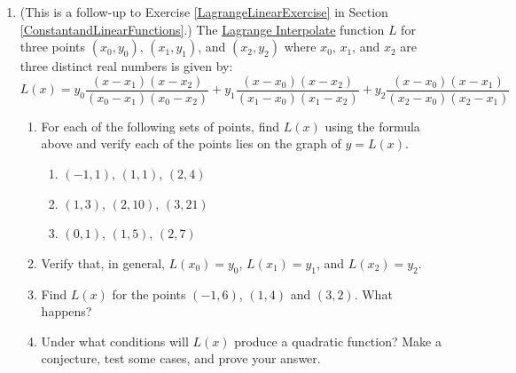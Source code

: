 \documentclass{ximera}
\begin{document}
\begin{enumerate}
\setcounter{enumi}{\value{HW}}



\item \label{LagrangeQuadExercise} (This is a follow-up to Exercise \ref{LagrangeLinearExercise} in Section \ref{ConstantandLinearFunctions}.) The \href{https://en.wikipedia.org/wiki/Lagrange_polynomial}{\underline{Lagrange Interpolate}} function $L$ for three points $(x_{0}, y_{0})$, $(x_{1}, y_{1})$, and  $(x_{2}, y_{2})$ where $x_{0}$,  $x_{1}$, and $x_{2}$ are three distinct real numbers  is given by: \[L(x) = y_{0}  \dfrac{(x - x_{1}) (x - x_{2}) }{(x_{0} - x_{1})(x_{0} - x_{2})}+ y_{1}  \dfrac{(x - x_{0}) (x - x_{2}) }{(x_{1} - x_{0})(x_{1} - x_{2})} +  y_{2}  \dfrac{(x - x_{0}) (x - x_{1}) }{(x_{2} - x_{0})(x_{2} - x_{1})}\]

\begin{enumerate}

\item For each of the following sets of points,  find  $L(x)$ using the formula above and verify each of the points lies on the graph of $y = L(x)$.

\begin{multicols}{3}

\begin{enumerate}

\item  $(-1,1)$, $(1,1)$, $(2,4)$ %

\item  $(1,3)$, $(2,10)$, $(3,21)$ %

\item  $(0,1)$,  $(1,5)$, $(2,7)$ %



\end{enumerate}

\end{multicols}

\item  Verify that, in general, $L(x_{0}) = y_{0}$,  $L(x_{1}) = y_{1}$, and $L(x_{2}) = y_{2}$.

\item Find $L(x)$ for the points $(-1, 6)$, $(1, 4)$ and $(3,2)$.  What happens?  %

\item  Under what conditions will $L(x)$ produce a quadratic function?  Make a conjecture, test some cases, and prove your answer.


\end{enumerate}

\setcounter{HW}{\value{enumi}}
\end{enumerate}
\end{document}
